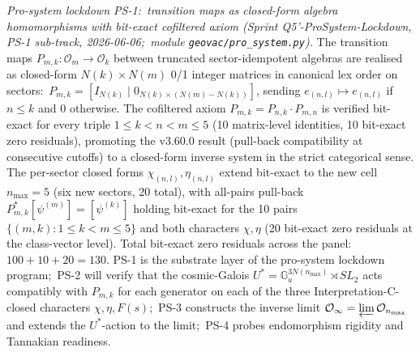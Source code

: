 \documentclass[11pt,a4paper]{article}
\theoremstyle{plain}
\theoremstyle{definition}
\begin{document}
\emph{Pro-system lockdown PS-1:\ transition maps as closed-form
algebra homomorphisms with bit-exact cofiltered axiom (Sprint
Q5'-ProSystem-Lockdown, PS-1 sub-track, 2026-06-06;\ module
\texttt{geovac/pro\_system.py}).}  The transition maps
$P_{m, k}: \mathcal{O}_m \to \mathcal{O}_k$ between truncated
sector-idempotent algebras are realised as closed-form
$N(k) \times N(m)$ 0/1 integer matrices in canonical lex order on
sectors:\ $P_{m, k} = [I_{N(k)} \mid 0_{N(k) \times (N(m) - N(k))}]$,
sending $e_{(n, l)} \mapsto e_{(n, l)}$ if $n \le k$ and $0$
otherwise.  The cofiltered axiom $P_{m, k} = P_{n, k} \cdot
P_{m, n}$ is verified bit-exact for every triple
$1 \le k < n < m \le 5$ (10 matrix-level identities, 10 bit-exact
zero residuals), promoting the v3.60.0 result (pull-back
compatibility at consecutive cutoffs) to a closed-form inverse
system in the strict categorical sense.  The per-sector closed
forms $\chi_{(n, l)}, \eta_{(n, l)}$ extend bit-exact to the new
cell $n_{\max} = 5$ (six new sectors, 20 total), with all-pairs
pull-back $P^*_{m, k}[\psi^{(m)}] = [\psi^{(k)}]$ holding bit-exact
for the 10 pairs $\{(m, k) : 1 \le k < m \le 5\}$ and both
characters $\chi, \eta$ (20 bit-exact zero residuals at the
class-vector level).  Total bit-exact zero residuals across the
panel:\ $100 + 10 + 20 = 130$.  PS-1 is the substrate layer of
the pro-system lockdown program;\ PS-2 will verify that the
cosmic-Galois $U^* = \mathbb{G}_a^{3 N(n_{\max})} \rtimes SL_2$
acts compatibly with $P_{m, k}$ for each generator on each of the
three Interpretation-C-closed characters $\chi, \eta, F(s)$;\ PS-3
constructs the inverse limit
$\mathcal{O}_\infty = \varprojlim \mathcal{O}_{n_{\max}}$ and
extends the $U^*$-action to the limit;\ PS-4 probes endomorphism
rigidity and Tannakian readiness.
\end{document}
